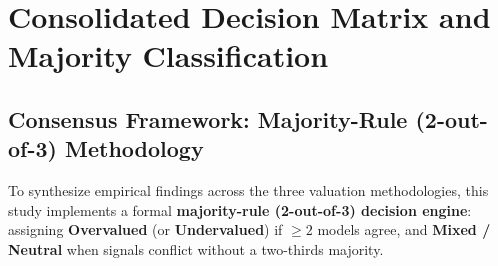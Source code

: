 
\clearpage
\section[Consolidated Decision Matrix]{Consolidated Decision Matrix and Majority Classification}

\subsection{Consensus Framework: Majority-Rule (2-out-of-3) Methodology}
To synthesize empirical findings across the three valuation methodologies, this study implements a formal \textbf{majority-rule (2-out-of-3) decision engine}: assigning \textbf{Overvalued} (or \textbf{Undervalued}) if $\ge 2$ models agree, and \textbf{Mixed / Neutral} when signals conflict without a two-thirds majority.

